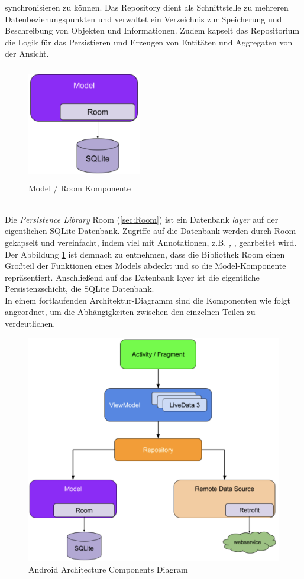 synchronisieren zu können. Das Repository dient als Schnittstelle zu mehreren Datenbeziehungspunkten und verwaltet ein Verzeichnis zur 
Speicherung und Beschreibung von Objekten und Informationen. Zudem kapselt das Repositorium die Logik für das Persistieren und Erzeugen von 
Entitäten und Aggregaten von der Ansicht. 
\begin{figure}[hbt!]
    \centering
    \includegraphics[width=5cm,height=5cm,keepaspectratio]{2GrundlagenX/Bilder/roomComp.png}
    \caption{Model / Room Komponente \cite{aac.2020j}}
    \label{pic:roomComp}
\end{figure} 
\\ 
Die \textit{Persistence Library} Room (\ref{sec:Room}) ist ein Datenbank \textit{layer} auf der eigentlichen SQLite Datenbank. Zugriffe auf 
die Datenbank werden durch Room gekapselt und vereinfacht, indem viel mit Annotationen, z.B. \textit{\@Entity, \@Dao}, gearbeitet wird. Der 
Abbildung \ref{pic:roomComp} ist demnach zu entnehmen, dass die Bibliothek Room einen Großteil der Funktionen eines Models abdeckt und so 
die Model-Komponente repräsentiert. Anschließend auf das Datenbank layer ist die eigentliche Persistenzschicht, die SQLite Datenbank.
\\ 
\linebreak 
In einem fortlaufenden Architektur-Diagramm sind die Komponenten wie folgt angeordnet, um die Abhängigkeiten zwischen den einzelnen Teilen 
zu verdeutlichen. 
\begin{figure}[hbt!]
    \centering
    \includegraphics[width=15cm,height=10cm,keepaspectratio]{2GrundlagenX/Bilder/aac.png}
    \caption{Android Architecture Components Diagram\cite{aac.2020j}}
    \label{pic:aacDia}
\end{figure} 
